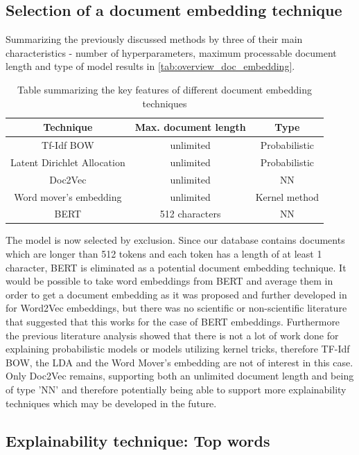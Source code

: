 \subsection{Selection of a document embedding technique}

Summarizing the previously discussed methods by three of their main characteristics - number of hyperparameters, maximum processable document length and type of model results in  \autoref{tab:overview_doc_embedding}.
\begin{table}
	\centering
	\begin{tabular}{ c | c | c }
		\hline 
		Technique & Max. document length & Type \\ \hline
		Tf-Idf BOW & unlimited & Probabilistic \\ \hline
		Latent Dirichlet Allocation & unlimited & Probabilistic \\ \hline
		Doc2Vec & unlimited & NN \\ \hline
		Word mover's embedding & unlimited & Kernel method \\ \hline
		BERT & 512 characters & NN \\ \hline
	\end{tabular}
	\caption{\label{tab:overview_doc_embedding} Table summarizing the key features of different document embedding techniques}
\end{table}

The model is now selected by exclusion. Since our database contains documents which are longer than 512 tokens and each token has a length of at least 1 character, BERT is eliminated as a potential document embedding technique. It would be possible to take word embeddings from BERT and average them in order to get a document embedding as it was proposed and further developed in \cite{deboomRepresentationLearningVery2016} for Word2Vec embeddings, but there was no scientific or non-scientific literature that suggested that this works for the case of BERT embeddings. 
Furthermore the previous literature analysis showed that there is not a lot of work done for explaining probabilistic models or models utilizing kernel tricks, therefore TF-Idf BOW, the LDA and the Word Mover's embedding are not of interest in this case. Only Doc2Vec remains, supporting both an unlimited document length and being of type 'NN' and therefore potentially being able to support more explainability techniques which may be developed in the future.

\subsection{Explainability technique: Top words}

